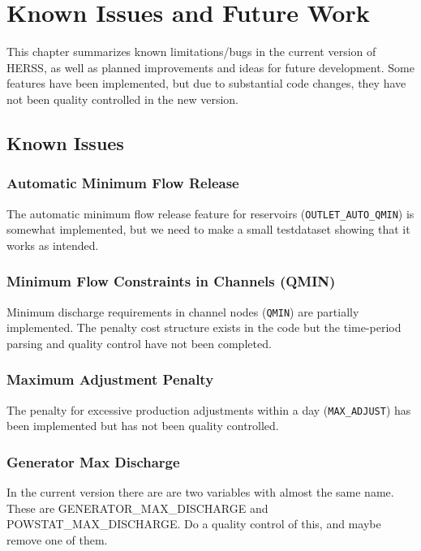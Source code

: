\documentclass[a4paper, 12pt]{report}
\begin{document}
	


	\pagebreak	
	\chapter{Known Issues and Future Work}
	\label{chap:future}
	This chapter summarizes known limitations/bugs in the current version of HERSS,
	as well as planned improvements and ideas for future development. Some features have been implemented, but due to substantial code changes, they have not been quality controlled in the new version. 
	

	\section{Known Issues}


	\subsection{Automatic Minimum Flow Release}
	The automatic minimum flow release feature for reservoirs
	(\texttt{OUTLET\_AUTO\_QMIN}) is somewhat implemented, but we need to make a small testdataset showing that it works as intended.

	\subsection{Minimum Flow Constraints in Channels (QMIN)}
	Minimum discharge requirements in channel nodes (\texttt{QMIN}) are partially
	implemented. The penalty cost structure exists in the code but the
	time-period parsing and quality control have not been completed.


	\subsection{Maximum Adjustment Penalty}
	The penalty for excessive production adjustments within a day
	(\texttt{MAX\_ADJUST}) has been implemented but has not been quality
	controlled. 


	\subsection{Generator Max Discharge}
	In the current version there are are two variables with almost the same name. These are GENERATOR\_MAX\_DISCHARGE and POWSTAT\_MAX\_DISCHARGE. Do a quality control of this, and maybe remove one of them. 
\end{document}
